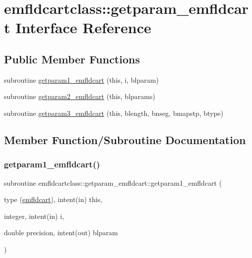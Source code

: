 \hypertarget{interfaceemfldcartclass_1_1getparam__emfldcart}{}\section{emfldcartclass\+::getparam\+\_\+emfldcart Interface Reference}
\label{interfaceemfldcartclass_1_1getparam__emfldcart}
\subsection*{Public Member Functions}
\begin{DoxyCompactItemize}
\item 
subroutine \mbox{\hyperlink{interfaceemfldcartclass_1_1getparam__emfldcart_a82d02d55fd96eb907677e40958d62e3c}{getparam1\+\_\+emfldcart}} (this, i, blparam)
\item 
subroutine \mbox{\hyperlink{interfaceemfldcartclass_1_1getparam__emfldcart_a46024264d488df4a38e0bf76feda2430}{getparam2\+\_\+emfldcart}} (this, blparams)
\item 
subroutine \mbox{\hyperlink{interfaceemfldcartclass_1_1getparam__emfldcart_ac0654b403917d66c45c4bdb51d8ea727}{getparam3\+\_\+emfldcart}} (this, blength, bnseg, bmapstp, btype)
\end{DoxyCompactItemize}


\subsection{Member Function/\+Subroutine Documentation}
\mbox{\label{interfaceemfldcartclass_1_1getparam__emfldcart_a82d02d55fd96eb907677e40958d62e3c}} 
\subsubsection{\texorpdfstring{getparam1\_emfldcart()}{getparam1\_emfldcart()}}
{\footnotesize\ttfamily subroutine emfldcartclass\+::getparam\+\_\+emfldcart\+::getparam1\+\_\+emfldcart (\begin{DoxyParamCaption}\item[{type (\mbox{\hyperlink{namespaceemfldcartclass_structemfldcartclass_1_1emfldcart}{emfldcart}}), intent(in)}]{this,  }\item[{integer, intent(in)}]{i,  }\item[{double precision, intent(out)}]{blparam }\end{DoxyParamCaption})}

